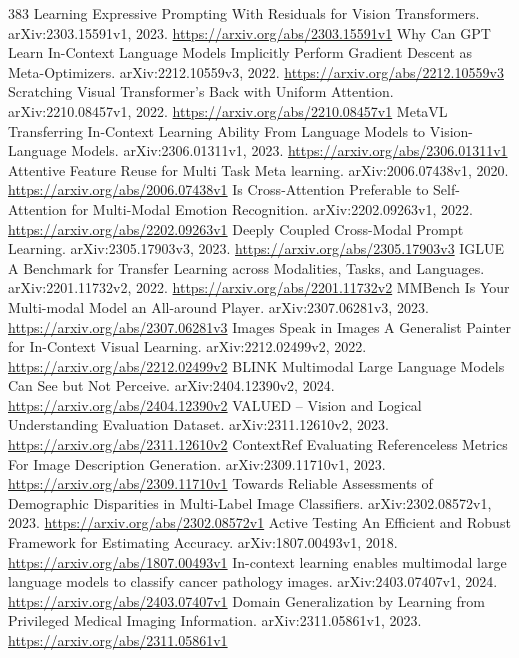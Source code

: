 \documentclass[11pt]{article}
\begin{document}
\begin{thebibliography}{383}
 Learning Expressive Prompting With Residuals for Vision Transformers. arXiv:2303.15591v1, 2023. \url{https://arxiv.org/abs/2303.15591v1}
 Why Can GPT Learn In-Context Language Models Implicitly Perform Gradient Descent as Meta-Optimizers. arXiv:2212.10559v3, 2022. \url{https://arxiv.org/abs/2212.10559v3}
 Scratching Visual Transformer's Back with Uniform Attention. arXiv:2210.08457v1, 2022. \url{https://arxiv.org/abs/2210.08457v1}
 MetaVL Transferring In-Context Learning Ability From Language Models to Vision-Language Models. arXiv:2306.01311v1, 2023. \url{https://arxiv.org/abs/2306.01311v1}
 Attentive Feature Reuse for Multi Task Meta learning. arXiv:2006.07438v1, 2020. \url{https://arxiv.org/abs/2006.07438v1}
 Is Cross-Attention Preferable to Self-Attention for Multi-Modal Emotion Recognition. arXiv:2202.09263v1, 2022. \url{https://arxiv.org/abs/2202.09263v1}
 Deeply Coupled Cross-Modal Prompt Learning. arXiv:2305.17903v3, 2023. \url{https://arxiv.org/abs/2305.17903v3}
 IGLUE A Benchmark for Transfer Learning across Modalities, Tasks, and Languages. arXiv:2201.11732v2, 2022. \url{https://arxiv.org/abs/2201.11732v2}
 MMBench Is Your Multi-modal Model an All-around Player. arXiv:2307.06281v3, 2023. \url{https://arxiv.org/abs/2307.06281v3}
 Images Speak in Images A Generalist Painter for In-Context Visual Learning. arXiv:2212.02499v2, 2022. \url{https://arxiv.org/abs/2212.02499v2}
 BLINK Multimodal Large Language Models Can See but Not Perceive. arXiv:2404.12390v2, 2024. \url{https://arxiv.org/abs/2404.12390v2}
 VALUED -- Vision and Logical Understanding Evaluation Dataset. arXiv:2311.12610v2, 2023. \url{https://arxiv.org/abs/2311.12610v2}
 ContextRef Evaluating Referenceless Metrics For Image Description Generation. arXiv:2309.11710v1, 2023. \url{https://arxiv.org/abs/2309.11710v1}
 Towards Reliable Assessments of Demographic Disparities in Multi-Label Image Classifiers. arXiv:2302.08572v1, 2023. \url{https://arxiv.org/abs/2302.08572v1}
 Active Testing An Efficient and Robust Framework for Estimating Accuracy. arXiv:1807.00493v1, 2018. \url{https://arxiv.org/abs/1807.00493v1}
 In-context learning enables multimodal large language models to classify cancer pathology images. arXiv:2403.07407v1, 2024. \url{https://arxiv.org/abs/2403.07407v1}
 Domain Generalization by Learning from Privileged Medical Imaging Information. arXiv:2311.05861v1, 2023. \url{https://arxiv.org/abs/2311.05861v1}

\end{thebibliography}
\end{document}
